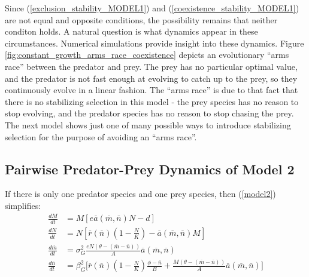 \documentclass{amsart}
\theoremstyle{definition}
\theoremstyle{remark}
\numberwithin{equation}{section}
\begin{document}
Since (\ref{exclusion_stability_MODEL1}) and (\ref{coexistence_stability_MODEL1}) are not equal and opposite conditions, the possibility remains that neither conditon holds.  A natural question is what dynamics appear in these circumstances.  Numerical simulations provide insight into these dynamics.  Figure \ref{fig:constant_growth_arms_race_coexistence} depicts an evolutionary ``arms race'' between the predator and prey.  The prey has no particular optimal value, and the predator is not fast enough at evolving to catch up to the prey, so they continuously evolve in a linear fashion.  The ``arms race'' is due to that fact that there is no stabilizing selection in this model - the prey species has no reason to stop evolving, and the predator species has no reason to stop chasing the prey.  The next model shows just one of many possible ways to introduce stabilizing selection for the purpose of avoiding an ``arms race''.



































\subsection{Pairwise Predator-Prey Dynamics of Model 2}
If there is only one predator species and one prey species, then (\ref{model2}) simplifies:
\begin{subequations}
	\label{MODEL2}
	\begin{align}
		\label{eq:MODEL2_A}
		\frac{dM}{dt} &= M\left[e\overline{a}(\overline{m}, \overline{n})N - d\right] \\[5px]
		\label{eq:MODEL2_B}
		\frac{dN}{dt} &= N\left[\overline{r}(\overline{n})\left(1 - \frac{N}{K}\right) - \overline{a}(\overline{m}, \overline{n})M\right] \\[5px]
		\label{eq:MODEL2_C}
		\frac{d\overline{m}}{dt} &= \sigma_{G}^2\frac{eN(\theta - (\overline{m} - \overline{n}))}{A}\overline{a}(\overline{m}, \overline{n}) \\[5px]
		\label{eq:MODEL2_D}
		\frac{d\overline{n}}{dt} &= \beta_{G}^2\Bigg[\overline{r}(\overline{n})\left(1 - \frac{N}{K}\right)\frac{\phi - \overline{n}}{B} + \frac{M(\theta - (\overline{m} - \overline{n}))}{A}\overline{a}(\overline{m}, \overline{n})\Bigg]
	\end{align}
\end{subequations}
\end{document}
